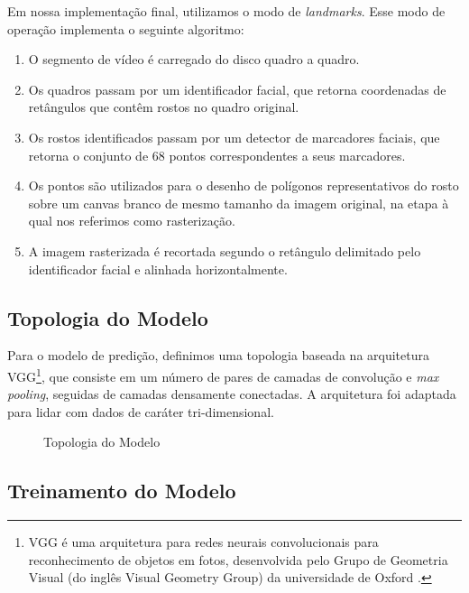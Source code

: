 Em nossa implementação final, utilizamos o modo de \textit{landmarks}. Esse modo de operação implementa o seguinte algoritmo:

\begin{enumerate}
    \item O segmento de vídeo é carregado do disco quadro a quadro. 
    \item Os quadros passam por um identificador facial, que retorna coordenadas de retângulos que contêm rostos no quadro original.
    \item Os rostos identificados passam por um detector de marcadores faciais, que retorna o conjunto de 68 pontos correspondentes a seus marcadores.
    \item Os pontos são utilizados para o desenho de polígonos representativos do rosto sobre um canvas branco de mesmo tamanho da imagem original, na etapa à qual nos referimos como rasterização.
    \item A imagem rasterizada é recortada segundo o retângulo delimitado pelo identificador facial e alinhada horizontalmente.
\end{enumerate}

\subsection{Topologia do Modelo}
\label{sec:topology}

Para o modelo de predição, definimos uma topologia baseada na arquitetura VGG\footnote{VGG é uma arquitetura para redes neurais convolucionais para reconhecimento de objetos em fotos, desenvolvida pelo Grupo de Geometria Visual (do inglês Visual Geometry Group) da universidade de Oxford \cite{simonyanVeryDeepConvolutional2015}.}, que consiste em um número de pares de camadas de convolução e \textit{max pooling}, seguidas de camadas densamente conectadas.
A arquitetura foi adaptada para lidar com dados de caráter tri-dimensional.

\begin{figure}[ht]
    \centering
    \resizebox{!}{0.7\textheight}{
        
        }
    \caption{Topologia do Modelo}
    \label{fig:topology_typeA}
\end{figure}

\subsection{Treinamento do Modelo}
\label{sec:train-flow}

